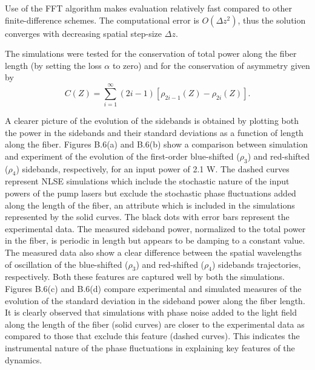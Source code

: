 Use of the FFT algorithm makes evaluation relatively fast compared to other 
finite-difference schemes. The computational error is $O(\Delta z^2)$, thus 
the solution converges with decreasing spatial step-size $\Delta z$. 

The simulations were tested for the conservation of total power along the 
fiber length (by setting the loss $\alpha$ to zero) and for the conservation 
of asymmetry \cite{thompson1,hart1} given by 
\begin{equation}
C(Z) = \sum_{i=1}^{\infty}(2i-1)[\rho_{2i-1}(Z)-\rho_{2i}(Z)] .
\end{equation}

A clearer picture of the evolution of the sidebands is obtained by plotting both the 
power in the sidebands and their standard deviations as a function of length along the fiber. Figures B.6(a) and B.6(b) show a comparison between simulation and experiment of the evolution 
of the first-order blue-shifted ($\rho_3$) and red-shifted ($\rho_4$) sidebands,  
respectively, for an input power of 2.1 W. The dashed curves represent NLSE simulations 
which include the stochastic nature of the input powers of the pump lasers but exclude 
the stochastic phase fluctuations added along the length of the fiber, an attribute 
which is included in the simulations represented by the solid curves. The black dots 
with error bars represent the experimental data. The measured sideband 
power, normalized to the total power in the fiber, is periodic in length but 
appears to be damping to a constant value. The measured data also show a clear 
difference between the spatial wavelengths of oscillation of the blue-shifted ($\rho_3$) and red-shifted ($\rho_4$) sidebands trajectories, respectively. Both these features are captured well by both the simulations. Figures B.6(c) and B.6(d) compare experimental and simulated 
measures of the evolution of the standard deviation in the sideband power 
along the fiber length. It is clearly observed that simulations with phase noise 
added to the light field along the length of the fiber (solid curves) are closer to the 
experimental data as compared to those that exclude this feature (dashed curves). This indicates
the instrumental nature of the phase fluctuations in explaining key features of the dynamics.

